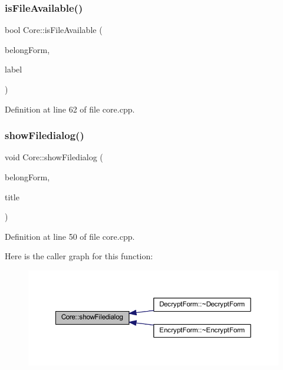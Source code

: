 \subsubsection{\texorpdfstring{is\+File\+Available()}{isFileAvailable()}\hspace{0.1cm}{\footnotesize\ttfamily [2/2]}}
{\footnotesize\ttfamily bool Core\+::is\+File\+Available (\begin{DoxyParamCaption}\item[{\hyperlink{class_q_widget}{Q\+Widget} $\ast$}]{belong\+Form,  }\item[{Q\+Line\+Edit $\ast$}]{label }\end{DoxyParamCaption})}



Definition at line 62 of file core.\+cpp.

\hypertarget{class_core_adf62d4f996b0cb94dba269110b136dc1}{}\label{class_core_adf62d4f996b0cb94dba269110b136dc1} 
\subsubsection{\texorpdfstring{show\+Filedialog()}{showFiledialog()}}
{\footnotesize\ttfamily void Core\+::show\+Filedialog (\begin{DoxyParamCaption}\item[{\hyperlink{class_q_widget}{Q\+Widget} $\ast$}]{belong\+Form,  }\item[{Q\+String}]{title }\end{DoxyParamCaption})}



Definition at line 50 of file core.\+cpp.

Here is the caller graph for this function\+:\nopagebreak
\begin{figure}[H]
\begin{center}
\leavevmode
\includegraphics[width=350pt]{class_core_adf62d4f996b0cb94dba269110b136dc1_icgraph}
\end{center}
\end{figure}
\hypertarget{class_core_ad3503f8f37ca8f8f31bbdefb273a9f78}{}\label{class_core_ad3503f8f37ca8f8f31bbdefb273a9f78} 
